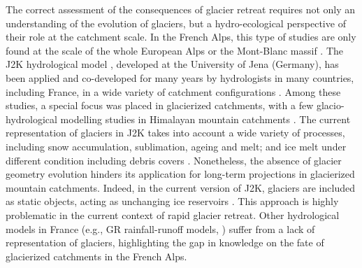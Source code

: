 The correct assessment of the consequences of glacier retreat requires not only an understanding of the evolution of glaciers, but a hydro-ecological perspective of their role at the catchment scale. In the French Alps, this type of studies are only found at the scale of the whole European Alps \citep{coppola_impact_2018} or the Mont-Blanc massif \citep{laurent_impact_2020}. The J2K hydrological model \citep{krause_quantifying_2002}, developed at the University of Jena (Germany), has been applied and co-developed for many years by hydrologists in many countries, including France, in a wide variety of catchment configurations \citep{branger_investigating_2012, braud_j2000-rhone_2017, horner_information_2020}. Among these studies, a special focus was placed in glacierized catchments, with a few glacio-hydrological modelling studies in Himalayan mountain catchments \citep{gao_test_2012, nepal_understanding_2014}. The current representation of glaciers in J2K takes into account a wide variety of processes, including snow accumulation, sublimation, ageing and melt; and ice melt under different condition including debris covers \citep{nepal_understanding_2014}. Nonetheless, the absence of glacier geometry evolution hinders its application for long-term projections in glacierized mountain catchments. Indeed, in the current version of J2K, glaciers are included as static objects, acting as unchanging ice reservoirs \citep{nepal_understanding_2014}. This approach is highly problematic in the current context of rapid glacier retreat.  Other hydrological models in France (e.g., GR rainfall-runoff models, \cite{coron_suite_2017}) suffer from a lack of representation of glaciers, highlighting the gap in knowledge on the fate of glacierized catchments in the French Alps. 

